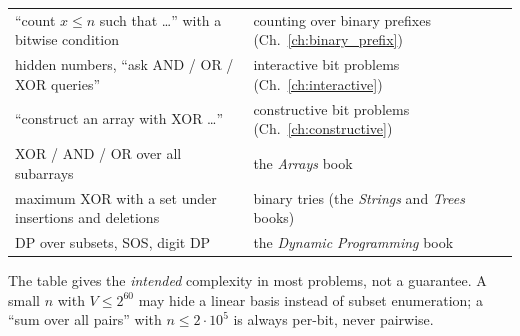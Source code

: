 \begin{tabularx}{\linewidth}{@{}>{\raggedright\arraybackslash}p{6.2cm} X@{}}
``count $x \le n$ such that \ldots'' with a bitwise condition & counting over binary prefixes (Ch.~\ref{ch:binary_prefix}) \\
hidden numbers, ``ask AND / OR / XOR queries'' & interactive bit problems (Ch.~\ref{ch:interactive}) \\
``construct an array with XOR \ldots'' & constructive bit problems (Ch.~\ref{ch:constructive}) \\
XOR / AND / OR over all subarrays & the \textit{Arrays} book \\
maximum XOR with a set under insertions and deletions & binary tries (the \textit{Strings} and \textit{Trees} books) \\
DP over subsets, SOS, digit DP & the \textit{Dynamic Programming} book \\
\bottomrule
\end{tabularx}
\endgroup

\begin{warningbox}
The table gives the \emph{intended} complexity in most problems, not a guarantee. A small $n$ with $V \le 2^{60}$ may hide a linear basis instead of subset enumeration; a ``sum over all pairs'' with $n \le 2\cdot10^5$ is always per-bit, never pairwise.
\end{warningbox}
